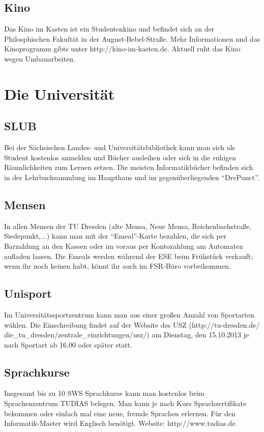 \documentclass[a4paper,12pt]{report}
\begin{document}
\subsection{Kino}
Das Kino im Kasten ist ein Studentenkino und befindet sich an der Philosphischen Fakultät in der August-Bebel-Straße. Mehr Informationen und das Kinoprogramm gibts unter http://kino-im-kasten.de. Aktuell ruht das Kino wegen Umbauarbeiten.

\section{Die Universität}
\subsection{SLUB}
Bei der Sächsischen Landes- und Universitätsbibliothek kann man sich als Student kostenlos anmelden und Bücher ausleihen oder sich in die ruhigen Räumlichkeiten zum Lernen setzen. Die meisten Informatikbücher befinden sich in der Lehrbuchsammlung im Haupthaus und im gegenüberliegenden ``DrePunct''.
\subsection{Mensen}
In allen Mensen der TU Dresden (alte Mensa, Neue Mensa, Reichenbachstraße, Siedepunkt,...) kann man mit der ``Emeal''-Karte bezahlen, die sich per Barzahlung an den Kassen oder im voraus per Kontozahlung am Automaten aufladen lassen. Die Emeals werden während der ESE beim Frühstück verkauft; wenn ihr noch keinen habt, könnt ihr auch im FSR-Büro vorbeikommen.

\subsection{Unisport}
Im Universitätssportzentrum kann man aus einer großen Anzahl von Sportarten wählen. Die Einschreibung findet auf der Website des USZ (http://tu-dresden.de/ die\_tu\_dresden/zentrale\_einrichtungen/usz/) am Dienstag, den 15.10.2013 je nach Sportart ab 16.00 oder später statt.

\subsection{Sprachkurse}
Insgesamt bis zu 10 SWS Sprachkurse kann man kostenlos beim Sprachenzentrum TUDIAS belegen. Man kann je nach Kurs Sprachzertifikate bekommen oder einfach mal eine neue, fremde Sprachen erlernen. Für den Informatik-Master wird Englisch benötigt. Website: http://www.tudias.de.
\end{document}
